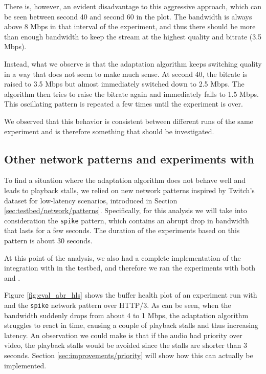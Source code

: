 There is, however, an evident disadvantage to this aggressive approach, which can be seen between second 40 and second 60 in the plot. The bandwidth is always above 8 Mbps in that interval of the experiment, and thus there should be more than enough bandwidth to keep the stream at the highest quality and bitrate (3.5 Mbps).

Instead, what we observe is that the adaptation algorithm keeps switching quality in a way that does not seem to make much sense. At second 40, the bitrate is raised to 3.5 Mbps but almost immediately switched down to 2.5 Mbps. The algorithm then tries to raise the bitrate again and immediately falls to 1.5 Mbps. This oscillating pattern is repeated a few times until the experiment is over.

We observed that this behavior is consistent between different runs of the same experiment and is therefore something that should be investigated.

\subsection{Other network patterns and experiments with \hlsjs{}}
\label{sec:eval/abr/hls}

To find a situation where the adaptation algorithm does not behave well and leads to playback stalls, we relied on new network patterns inspired by Twitch's dataset for low-latency scenarios, introduced in Section \ref{sec:testbed/network/patterns}. Specifically, for this analysis we will take into consideration the \texttt{spike} pattern, which contains an abrupt drop in bandwidth that lasts for a few seconds. The duration of the experiments based on this pattern is about 30 seconds.

At this point of the analysis, we also had a complete implementation of the integration with \hlsjs{} in the testbed, and therefore we ran the experiments with both \dashjs{} and \hlsjs{}.

Figure \ref{fig:eval_abr_hls} shows the buffer health plot of an experiment run with \hlsjs{} and the \texttt{spike} network pattern over HTTP/3. As can be seen, when the bandwidth suddenly drops from about 4 to 1 Mbps, the adaptation algorithm struggles to react in time, causing a couple of playback stalls and thus increasing latency. An observation we could make is that if the audio had priority over video, the playback stalls would be avoided since the stalls are shorter than 3 seconds. Section \ref{sec:improvements/priority} will show how this can actually be implemented.

